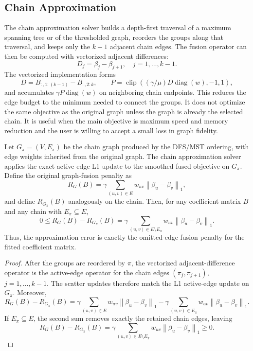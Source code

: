 \documentclass[twoside,11pt]{article}
\newcommand{\norm}[1]{\left\lVert #1 \right\rVert}
\DeclareMathOperator{\clip}{clip}
\begin{document}
\subsection{Chain Approximation}

The chain approximation solver builds a depth-first traversal of a maximum spanning tree or of the thresholded graph, reorders the groups along that traversal, and keeps only the $k-1$ adjacent chain edges.
The fusion operator can then be computed with vectorized adjacent differences:
\[
  D_j = \beta_j-\beta_{j+1}, \quad j=1,\ldots,k-1.
\]
The vectorized implementation forms
\[
  D = B_{:,1:(k-1)} - B_{:,2:k}, \qquad
  P = \clip((\gamma/\mu)D\operatorname{diag}(w),-1,1),
\]
and accumulates $\gamma P\operatorname{diag}(w)$ on neighboring chain endpoints.
This reduces the edge budget to the minimum needed to connect the groups. 
It does not optimize the same objective as the original graph unless the graph is already the selected chain. 
It is useful when the main objective is maximum speed and memory reduction and the user is willing to accept a small loss in graph fidelity.

\begin{proposition}
\label{prop:chain-target}
\leavevmode\par\noindent
Let $G_\pi=(V,E_\pi)$ be the chain graph produced by the DFS/MST ordering, with edge weights inherited from the original graph. 
The chain approximation solver applies the exact active-edge L1 update to the smoothed fused objective on $G_\pi$. 
Define the original graph-fusion penalty as
\[
  R_G(B)=\gamma\sum_{(u,v)\in E}
  w_{uv}\norm{\beta_u-\beta_v}_1,
\]
and define $R_{G_\pi}(B)$ analogously on the chain. 
Then, for any coefficient matrix $B$ and any chain with $E_\pi\subseteq E$,
\[
  0 \leq R_G(B)-R_{G_\pi}(B)
  =
  \gamma\sum_{(u,v)\in E\setminus E_\pi}
  w_{uv}\norm{\beta_u-\beta_v}_1.
\]
Thus, the approximation error is exactly the omitted-edge fusion penalty for the fitted coefficient matrix.
\end{proposition}

\begin{proof}
After the groups are reordered by $\pi$, the vectorized adjacent-difference operator is the active-edge operator for the chain edges $(\pi_j,\pi_{j+1})$, $j=1,\ldots,k-1$. 
The scatter updates therefore match the L1 active-edge update on $G_\pi$. 
Moreover,
\[
  R_G(B)-R_{G_\pi}(B)
  =
  \gamma\sum_{(u,v)\in E}w_{uv}\norm{\beta_u-\beta_v}_1
  -
  \gamma\sum_{(u,v)\in E_\pi}w_{uv}\norm{\beta_u-\beta_v}_1.
\]
If $E_\pi\subseteq E$, the second sum removes exactly the retained chain edges, leaving
\[
  R_G(B)-R_{G_\pi}(B)
  =
  \gamma\sum_{(u,v)\in E\setminus E_\pi}
  w_{uv}\norm{\beta_u-\beta_v}_1
  \geq 0.
\]
\end{proof}
\end{document}
